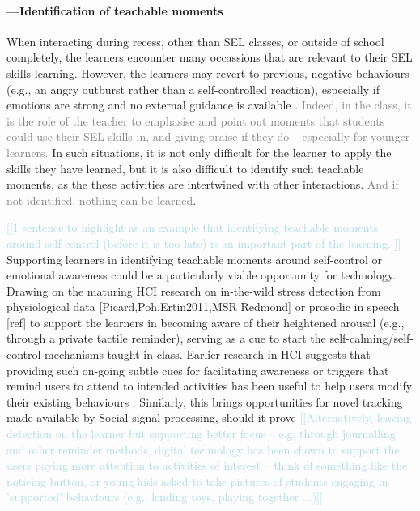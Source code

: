 \documentclass[prodmode,acmtochi]{acmsmall}
\newcommand{\todo}[1]{\textrm{\textrm{\textcolor{LightBlue}{[[#1]]} } } }
\newcommand{\rephrase}[1]{\textrm{\textrm{\textcolor{gray}{#1}}}}
\begin{document}
\paragraph{---Identification of teachable moments}
When interacting during recess, other than SEL classes, or outside of school completely, the learners encounter many occassions that are relevant to their SEL skills learning. However, the learners may revert to previous, negative behaviours (e.g., an angry outburst rather than a self-controlled reaction), especially if emotions are strong  and no external guidance is available \cite[p. 56]{Elias}. \rephrase{Indeed, in the class, it is the role of the teacher to emphasise and point out moments that students could use their SEL skills in, and giving praise if they do -- especially for younger learners.} In such situations, it is not only difficult for the learner to apply the skills they have learned, but it is also difficult to identify such teachable moments, as the these activities are intertwined with other interactions. \rephrase{And if not identified, nothing can be learned}. 

\todo{1 sentence to highlight as an example that identifying teachable moments around self-control (before it is too late) is an important part of the learning. }
Supporting learners in identifying teachable moments around self-control or emotional awareness could be a particularly viable opportunity for technology.  
%
Drawing on the maturing HCI research on in-the-wild stress detection from physiological data [Picard,Poh,Ertin2011,MSR Redmond] or prosodic in speech [ref] to support the learners in becoming aware of their heightened arousal (e.g., through a private tactile reminder), serving as a cue to start the self-calming/self-control mechanisms taught in class. Earlier research in HCI suggests that providing such on-going subtle cues for facilitating awareness or triggers that remind users to attend to intended activities has been useful to help users modify their existing behaviours \cite{Consolvo2009,Obermair2008}. Similarly, this brings opportunities for novel tracking made available by Social signal processing, should it prove 
\todo{Alternatively, leaving detection on the learner but supporting better focus -- e.g,  through journalling and other reminder methods, digital technology has been shown to support the users paying more attention to activities of interest -- think of something like the noticing button, or young kids asked to take pictures of students engaging in 'supported' behaviours (e.g., lending toys, playing together ...)}
\end{document}
